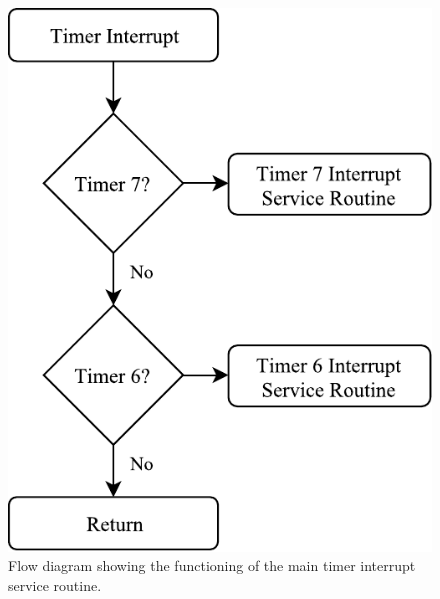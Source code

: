 \begin{figure}[H]
\centering
\includegraphics[scale = 1]{pics/Soft5.pdf}
\caption{Flow diagram showing the functioning of the main timer interrupt service routine.}
\label{fig:Soft5}
\end{figure}

